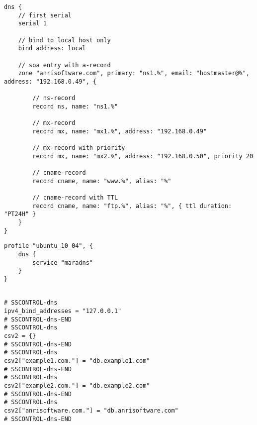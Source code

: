 \begin{lstlisting}[style=Java,label=lst:dns_example_min_script,
title={Dns service minimumal example script using the zone placeholder.}]
dns {
    // first serial
    serial 1
    
    // bind to local host only
    bind address: local
    
    // soa entry with a-record
    zone "anrisoftware.com", primary: "ns1.%", email: "hostmaster@%", address: "192.168.0.49", {
    
        // ns-record
        record ns, name: "ns1.%"
        
        // mx-record
        record mx, name: "mx1.%", address: "192.168.0.49"
        
        // mx-record with priority
        record mx, name: "mx2.%", address: "192.168.0.50", priority 20
        
        // cname-record
        record cname, name: "www.%", alias: "%"
        
        // cname-record with TTL
        record cname, name: "ftp.%", alias: "%", { ttl duration: "PT24H" }
    }
}
\end{lstlisting}

\begin{lstlisting}[style=Java,label=lst:dns_ubuntu_profile_min,
title={Minimal Ubuntu MaraDNS profile, only the DNS service type is needed. The other profile properties are set to default values.}]
profile "ubuntu_10_04", {
    dns {
        service "maradns"
    }
}
\end{lstlisting}

\begin{lstlisting}[style=rcfile_nonumbers,
label=lst:dns_mararc_example,
title={Example MaraDNS configuration file that is created from the DNS profile 
and script. The file is saved as /etc/maradns/mararc}]

# SSCONTROL-dns
ipv4_bind_addresses = "127.0.0.1"
# SSCONTROL-dns-END
# SSCONTROL-dns
csv2 = {}
# SSCONTROL-dns-END
# SSCONTROL-dns
csv2["example1.com."] = "db.example1.com"
# SSCONTROL-dns-END
# SSCONTROL-dns
csv2["example2.com."] = "db.example2.com"
# SSCONTROL-dns-END
# SSCONTROL-dns
csv2["anrisoftware.com."] = "db.anrisoftware.com"
# SSCONTROL-dns-END
\end{lstlisting}

